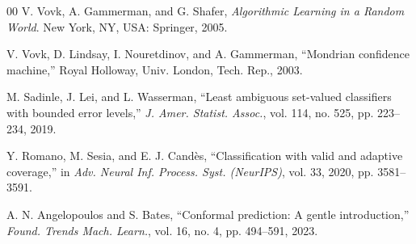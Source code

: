 \documentclass[conference]{IEEEtran}
\begin{document}
\begin{thebibliography}{00}
V. Vovk, A. Gammerman, and G. Shafer, \emph{Algorithmic Learning in a Random World}. New York, NY, USA: Springer, 2005.

V. Vovk, D. Lindsay, I. Nouretdinov, and A. Gammerman, ``Mondrian confidence machine,'' Royal Holloway, Univ. London, Tech. Rep., 2003.

M. Sadinle, J. Lei, and L. Wasserman, ``Least ambiguous set-valued classifiers with bounded error levels,'' \emph{J. Amer. Statist. Assoc.}, vol. 114, no. 525, pp. 223--234, 2019.

Y. Romano, M. Sesia, and E. J. Cand\`{e}s, ``Classification with valid and adaptive coverage,'' in \emph{Adv. Neural Inf. Process. Syst. (NeurIPS)}, vol. 33, 2020, pp. 3581--3591.

A. N. Angelopoulos and S. Bates, ``Conformal prediction: A gentle introduction,'' \emph{Found. Trends Mach. Learn.}, vol. 16, no. 4, pp. 494--591, 2023.

\end{thebibliography}
\end{document}
